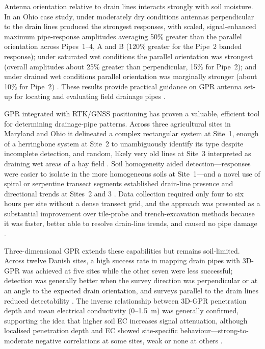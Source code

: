 Antenna orientation relative to drain lines interacts strongly with soil moisture. In an Ohio case study, under moderately dry conditions antennas perpendicular to the drain lines produced the strongest responses, with scaled, signal-enhanced maximum pipe-response amplitudes averaging 50\% greater than the parallel orientation across Pipes~1--4, A and B (120\% greater for the Pipe~2 banded response); under saturated wet conditions the parallel orientation was strongest (overall amplitudes about 25\% greater than perpendicular, 15\% for Pipe~2); and under drained wet conditions parallel orientation was marginally stronger (about 10\% for Pipe~2) \parencite{Allred2013}. These results provide practical guidance on GPR antenna set-up for locating and evaluating field drainage pipes \parencite{Allred2013}.

GPR integrated with RTK/GNSS positioning has proven a valuable, efficient tool for determining drainage-pipe patterns. Across three agricultural sites in Maryland and Ohio it delineated a complex rectangular system at Site~1, enough of a herringbone system at Site~2 to unambiguously identify its type despite incomplete detection, and random, likely very old lines at Site~3 interpreted as draining wet areas of a hay field \parencite{Allred2018b}. Soil homogeneity aided detection---responses were easier to isolate in the more homogeneous soils at Site~1---and a novel use of spiral or serpentine transect segments established drain-line presence and directional trends at Sites~2 and 3 \parencite{Allred2018b}. Data collection required only four to six hours per site without a dense transect grid, and the approach was presented as a substantial improvement over tile-probe and trench-excavation methods because it was faster, better able to resolve drain-line trends, and caused no pipe damage \parencite{Allred2018b}.

Three-dimensional GPR extends these capabilities but remains soil-limited. Across twelve Danish sites, a high success rate in mapping drain pipes with 3D-GPR was achieved at five sites while the other seven were less successful; detection was generally better when the survey direction was perpendicular or at an angle to the expected drain orientation, and surveys parallel to the drain lines reduced detectability \parencite{Koganti2020}. The inverse relationship between 3D-GPR penetration depth and mean electrical conductivity (0--1.5~m) was generally confirmed, supporting the idea that higher soil EC increases signal attenuation, although localised penetration depth and EC showed site-specific behaviour---strong-to-moderate negative correlations at some sites, weak or none at others \parencite{Koganti2020}.

